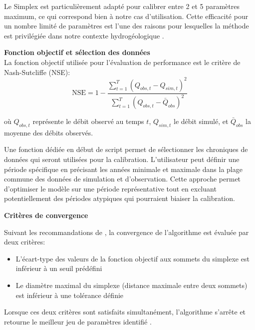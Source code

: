 Le Simplex est particulièrement adapté pour calibrer entre 2 et 5 paramètres maximum, ce qui correspond bien à notre cas d'utilisation. Cette efficacité pour un nombre limité de paramètres est l'une des raisons pour lesquelles la méthode est privilégiée dans notre contexte hydrogéologique \parencite{gaoImplementingNelderMeadSimplex2012}.

\vspace{2em}
\noindent\textbf{Fonction objectif et sélection des données}\\

La fonction objectif utilisée pour l'évaluation de performance est le critère de Nash-Sutcliffe (NSE):
\begin{equation}\label{eq:nse}
\text{NSE} = 1 - \frac{\sum_{t=1}^{T}(Q_{obs,t} - Q_{sim,t})^2}{\sum_{t=1}^{T}(Q_{obs,t} - \bar{Q}_{obs})^2}
\end{equation}

où $Q_{obs,t}$ représente le débit observé au temps $t$, $Q_{sim,t}$ le débit simulé, et $\bar{Q}_{obs}$ la moyenne des débits observés.

Une fonction dédiée en début de script permet de sélectionner les chroniques de données qui seront utilisées pour la calibration. L'utilisateur peut définir une période spécifique en précisant les années minimale et maximale dans la plage commune des données de simulation et d'observation. Cette approche permet d'optimiser le modèle sur une période représentative tout en excluant potentiellement des périodes atypiques qui pourraient biaiser la calibration.

\vspace{2em}
\noindent\textbf{Critères de convergence}

Suivant les recommandations de \textcite{gaoImplementingNelderMeadSimplex2012}, la convergence de l'algorithme est évaluée par deux critères:
\begin{itemize}
\item L'écart-type des valeurs de la fonction objectif aux sommets du simplexe est inférieur à un seuil prédéfini
\item Le diamètre maximal du simplexe (distance maximale entre deux sommets) est inférieur à une tolérance définie
\end{itemize}

Lorsque ces deux critères sont satisfaits simultanément, l'algorithme s'arrête et retourne le meilleur jeu de paramètres identifié \parencite{gaoImplementingNelderMeadSimplex2012}.
